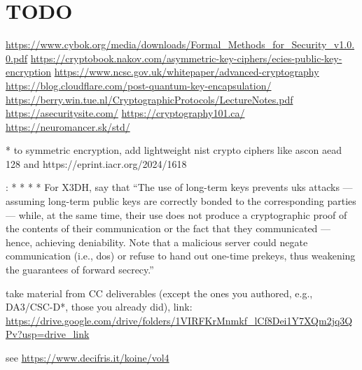 \cleardoublepage
\section{TODO}
\vspace{7.5cm}



\url{https://www.cybok.org/media/downloads/Formal_Methods_for_Security_v1.0.0.pdf}
\url{https://cryptobook.nakov.com/asymmetric-key-ciphers/ecies-public-key-encryption}
\url{https://www.ncsc.gov.uk/whitepaper/advanced-cryptography}
\url{https://blog.cloudflare.com/post-quantum-key-encapsulation/}
\url{https://berry.win.tue.nl/CryptographicProtocols/LectureNotes.pdf}
\url{https://asecuritysite.com/}
\url{https://cryptography101.ca/}
\url{https://neuromancer.sk/std/}

* to symmetric encryption, add lightweight nist crypto ciphers like ascon aead 128 and https://eprint.iacr.org/2024/1618

:
* 
* 
* 
* 
For X3DH, say that ``The use of long-term keys prevents \gls{uks} attacks --- assuming long-term public keys are correctly bonded to the corresponding parties --- while, at the same time, their use does not produce a cryptographic proof of the contents of their communication or the fact that they communicated --- hence, achieving deniability. Note that a malicious server could negate communication (i.e., \gls{dos}) or refuse to hand out one-time prekeys, thus weakening the guarantees of forward secrecy.''





take material from CC deliverables (except the ones you authored, e.g., DA3/CSC-D*, those you already did), link: \url{https://drive.google.com/drive/folders/1VIRFKrMnmkf_lCf8Dei1Y7XQm2jq3QPv?usp=drive_link}

see \url{https://www.decifris.it/koine/vol4}




